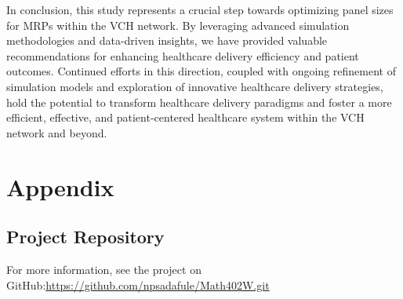 \documentclass[11pt]{article}
\theoremstyle{definition}
\begin{document}
In conclusion, this study represents a crucial step towards optimizing panel sizes for MRPs within the VCH network. By leveraging advanced simulation methodologies and data-driven insights, we have provided valuable recommendations for enhancing healthcare delivery efficiency and patient outcomes. Continued efforts in this direction, coupled with ongoing refinement of simulation models and exploration of innovative healthcare delivery strategies, hold the potential to transform healthcare delivery paradigms and foster a more efficient, effective, and patient-centered healthcare system within the VCH network and beyond. \\

\newpage




\newpage
\section{Appendix}

\subsection*{Project Repository}
For more information, see the project on GitHub:\url{https://github.com/npsadafule/Math402W.git}
\end{document}
